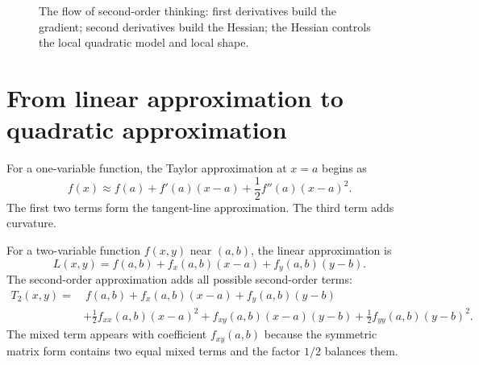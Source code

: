 \documentclass[11pt]{article}
\newcommand{\grad}{\nabla}
\newcommand{\T}{^{\mathsf T}}
\begin{document}
\begin{figure}[H]
\centering
{}
\caption{The flow of second-order thinking: first derivatives build the gradient; second derivatives build the Hessian; the Hessian controls the local quadratic model and local shape.}
\end{figure}

\section{From linear approximation to quadratic approximation}

For a one-variable function, the Taylor approximation at $x=a$ begins as
\[
f(x)\approx f(a)+f'(a)(x-a)+\frac12 f''(a)(x-a)^2.
\]
The first two terms form the tangent-line approximation. The third term adds curvature.

For a two-variable function $f(x,y)$ near $(a,b)$, the linear approximation is
\[
L(x,y)=f(a,b)+f_x(a,b)(x-a)+f_y(a,b)(y-b).
\]
The second-order approximation adds all possible second-order terms:
\[
\begin{aligned}
T_2(x,y)=&\ f(a,b)+f_x(a,b)(x-a)+f_y(a,b)(y-b)\\
&+\frac12 f_{xx}(a,b)(x-a)^2+f_{xy}(a,b)(x-a)(y-b)+\frac12 f_{yy}(a,b)(y-b)^2.
\end{aligned}
\]
The mixed term appears with coefficient $f_{xy}(a,b)$ because the symmetric matrix form contains two equal mixed terms and the factor $1/2$ balances them.
\end{document}
